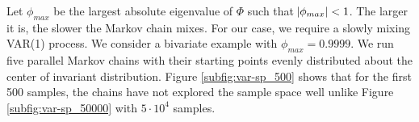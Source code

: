\documentclass[11pt]{article}
\theoremstyle{remark}
\begin{document}
Let $\phi_{max}$ be the largest absolute eigenvalue of $\Phi$ such that $\abs{\phi_{max}} < 1$. The larger it is, the slower the Markov chain mixes. For our case, we require a slowly mixing VAR(1) process. We consider a bivariate example with $\phi_{max} = 0.9999$. We run five parallel Markov chains with their starting points evenly distributed about the center of invariant distribution. Figure \ref{subfig:var-sp_500} shows that for the first 500 samples, the chains have not explored the sample space well unlike Figure \ref{subfig:var-sp_50000} with $5\cdot 10^4$ samples.  

\end{document}
